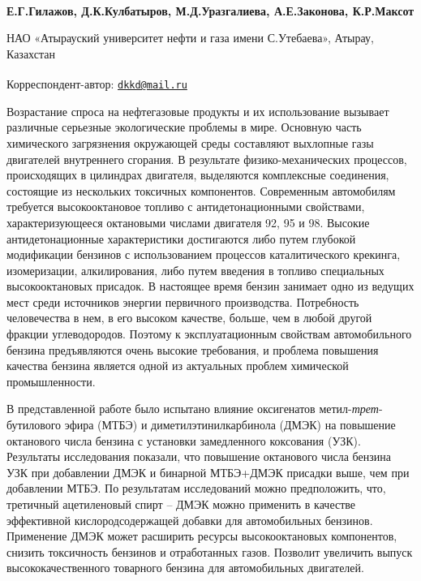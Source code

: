 
\begin{articleheader}

{\bfseries Е.Г.Гилажов, Д.К.Кулбатыров\textsuperscript{\envelope }, М.Д.Уразгалиева,
А.Е.Законова, К.Р.Максот}
\end{articleheader}

\begin{affiliation}
НАО «Атырауский университет нефти и газа имени С.Утебаева», Атырау,
Казахстан

\raggedright {\bfseries \textsuperscript{\envelope }}Корреспондент-автор: \href{mailto:dkkd@mail.ru}{\nolinkurl{dkkd@mail.ru}}
\end{affiliation}

Возрастание спроса на нефтегазовые продукты и их использование вызывает
различные серьезные экологические проблемы в мире. Основную часть
химического загрязнения окружающей среды составляют выхлопные газы
двигателей внутреннего сгорания. В результате физико-механических
процессов, происходящих в цилиндрах двигателя, выделяются комплексные
соединения, состоящие из нескольких токсичных компонентов. Современным
автомобилям требуется высокооктановое топливо с антидетонационными
свойствами, характеризующееся октановыми числами двигателя 92, 95 и 98.
Высокие антидетонационные характеристики достигаются либо путем глубокой
модификации бензинов с использованием процессов каталитического
крекинга, изомеризации, алкилирования, либо путем введения в топливо
специальных высокооктановых присадок. В настоящее время бензин занимает
одно из ведущих мест среди источников энергии первичного производства.
Потребность человечества в нем, в его высоком качестве, больше, чем в
любой другой фракции углеводородов. Поэтому к эксплуатационным свойствам
автомобильного бензина предъявляются очень высокие требования, и
проблема повышения качества бензина является одной из актуальных проблем
химической промышленности.

В представленной работе было испытано влияние оксигенатов
метил-\emph{трет}-бутилового эфира (МТБЭ) и диметилэтинилкарбинола
(ДМЭК) на повышение октанового числа бензина с установки замедленного
коксования (УЗК). Результаты исследования показали, что повышение
октанового числа бензина УЗК при добавлении ДМЭК и бинарной МТБЭ+ДМЭК
присадки выше, чем при добавлении МТБЭ. По результатам исследований
можно предположить, что, третичный ацетиленовый спирт -- ДМЭК можно
применить в качестве эффективной кислородсодержащей добавки для
автомобильных бензинов. Применение ДМЭК может расширить ресурсы
высокооктановых компонентов, снизить токсичность бензинов и отработанных
газов. Позволит увеличить выпуск высококачественного товарного бензина
для автомобильных двигателей.

